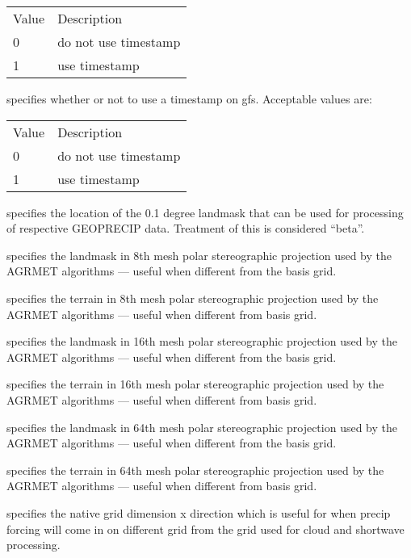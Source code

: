  \begin{tabular}{ll}
 Value & Description          \\
 0     & do not use timestamp \\
 1     & use timestamp        \\
 \end{tabular}

  specifies whether or not
 to use a timestamp on gfs.
 Acceptable values are:

 \begin{tabular}{ll}
 Value & Description          \\
 0     & do not use timestamp \\
 1     & use timestamp        \\
 \end{tabular}

  specifies the location of the 
 0.1 degree landmask that can be used for processing of 
 respective GEOPRECIP data.  Treatment of this is considered
 ``beta''.

  specifies the landmask
 in 8th mesh polar stereographic projection used by the AGRMET
 algorithms --- useful when different from the basis grid.

  specifies the terrain in
 8th mesh polar stereographic projection used by the AGRMET
 algorithms --- useful when different from basis grid.

  specifies the landmask in
 16th mesh polar stereographic projection used by the AGRMET
 algorithms --- useful when different from the basis grid.

  specifies the terrain in
 16th mesh polar stereographic projection used by the AGRMET
 algorithms --- useful when different from basis grid.

  specifies the landmask in
 64th mesh polar stereographic projection used by the AGRMET
 algorithms --- useful when different from the basis grid.

  specifies the terrain in
 64th mesh polar stereographic projection used by the AGRMET
 algorithms --- useful when different from basis grid.

  specifies the native grid dimension
 x direction which is useful for when precip forcing will come
 in on different grid from the grid used for cloud and shortwave
 processing.

